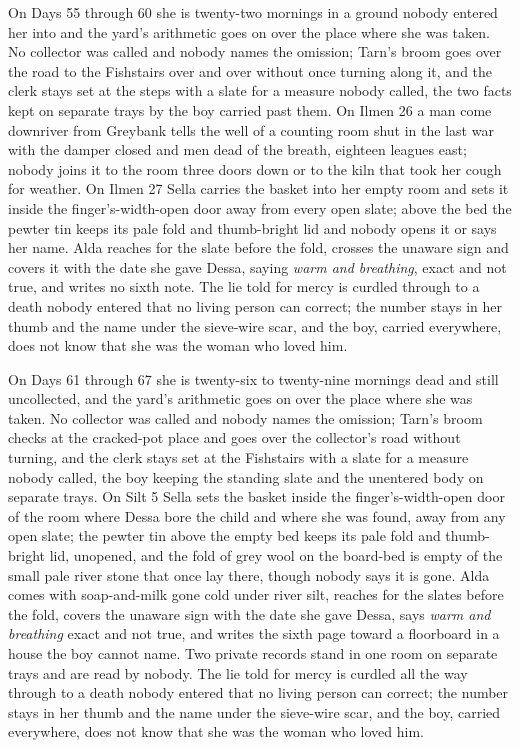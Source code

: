 \documentclass{design/chronicle}
\begin{document}
{On Days 55 through 60 she is twenty-two mornings in a ground nobody entered her into and the yard’s arithmetic goes on over the place where she was taken. No collector was called and nobody names the omission; Tarn’s broom goes over the road to the Fishstairs over and over without once turning along it, and the clerk stays set at the steps with a slate for a measure nobody called, the two facts kept on separate trays by the boy carried past them. On Ilmen 26 a man come downriver from Greybank tells the well of a counting room shut in the last war with the damper closed and men dead of the breath, eighteen leagues east; nobody joins it to the room three doors down or to the kiln that took her cough for weather. On Ilmen 27 Sella carries the basket into her empty room and sets it inside the finger’s-width-open door away from every open slate; above the bed the pewter tin keeps its pale fold and thumb-bright lid and nobody opens it or says her name. Alda reaches for the slate before the fold, crosses the unaware sign and covers it with the date she gave Dessa, saying \emph{warm and breathing}, exact and not true, and writes no sixth note. The lie told for mercy is curdled through to a death nobody entered that no living person can correct; the number stays in her thumb and the name under the sieve-wire scar, and the boy, carried everywhere, does not know that she was the woman who loved him.

On Days 61 through 67 she is twenty-six to twenty-nine mornings dead and still uncollected, and the yard’s arithmetic goes on over the place where she was taken. No collector was called and nobody names the omission; Tarn’s broom checks at the cracked-pot place and goes over the collector’s road without turning, and the clerk stays set at the Fishstairs with a slate for a measure nobody called, the boy keeping the standing slate and the unentered body on separate trays. On Silt 5 Sella sets the basket inside the finger’s-width-open door of the room where Dessa bore the child and where she was found, away from any open slate; the pewter tin above the empty bed keeps its pale fold and thumb-bright lid, unopened, and the fold of grey wool on the board-bed is empty of the small pale river stone that once lay there, though nobody says it is gone. Alda comes with soap-and-milk gone cold under river silt, reaches for the slates before the fold, covers the unaware sign with the date she gave Dessa, says \emph{warm and breathing} exact and not true, and writes the sixth page toward a floorboard in a house the boy cannot name. Two private records stand in one room on separate trays and are read by nobody. The lie told for mercy is curdled all the way through to a death nobody entered that no living person can correct; the number stays in her thumb and the name under the sieve-wire scar, and the boy, carried everywhere, does not know that she was the woman who loved him.

}
\end{document}
